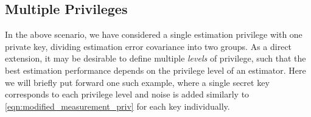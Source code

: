 % 
% 

\subsection{Multiple Privileges}\label{subsec:priv_estimation:est_mult_privileges}
In the above scenario, we have considered a single estimation privilege with one private key, dividing estimation error covariance into two groups. As a direct extension, it may be desirable to define multiple \textit{levels} of privilege, such that the best estimation performance depends on the privilege level of an estimator. Here we will briefly put forward one such example, where a single secret key corresponds to each privilege level and noise is added similarly to \eqref{eqn:modified_measurement_priv} for each key individually.


